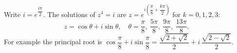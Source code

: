 Write $i=e^{\dfrac{i\pi}{2}}$. The solutions of $z^4=i$ are $z=e^{i\left(\dfrac{\pi}{8}+\dfrac{k\pi}{2}\right)}$ for $k=0,1,2,3$:
\[
\boxed{z=\cos\theta+i\sin\theta,\quad\theta=\dfrac{\pi}{8},\ \dfrac{5\pi}{8},\ \dfrac{9\pi}{8},\ \dfrac{13\pi}{8}}.
\]
For example the principal root is $\cos\dfrac{\pi}{8}+i\sin\dfrac{\pi}{8}=\dfrac{\sqrt{2+\sqrt2}}{2}+i\,\dfrac{\sqrt{2-\sqrt2}}{2}$.
